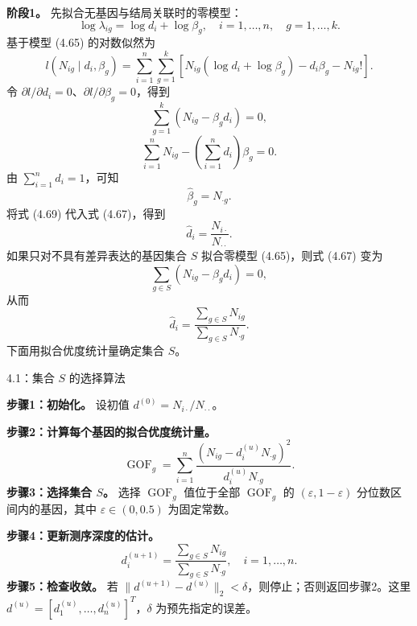 \par\medskip\noindent\textbf{阶段1。}
先拟合无基因与结局关联时的零模型：
\begin{equation}
\log\lambda_{ig}=\log d_i+\log\beta_g,\quad i=1,\ldots,n,\quad g=1,\ldots,k.
\tag{4.65}
\end{equation}
基于模型 (4.65) 的对数似然为
\begin{equation}
l(N_{ig}\mid d_i,\beta_g)=\sum_{i=1}^{n}\sum_{g=1}^{k}
\left[N_{ig}(\log d_i+\log\beta_g)-d_i\beta_g-N_{ig}!\right].
\tag{4.66}
\end{equation}
令 $\partial l/\partial d_i=0$、$\partial l/\partial\beta_g=0$，得到
\begin{equation}
\sum_{g=1}^{k}(N_{ig}-\beta_gd_i)=0,
\tag{4.67}
\end{equation}
\begin{equation}
\sum_{i=1}^{n}N_{ig}-\left(\sum_{i=1}^{n}d_i\right)\beta_g=0.
\tag{4.68}
\end{equation}
由 $\sum_{i=1}^{n}d_i=1$，可知
\begin{equation}
\hat\beta_g=N_{\cdot g}.
\tag{4.69}
\end{equation}
将式 (4.69) 代入式 (4.67)，得到
\begin{equation}
\hat d_i=\frac{N_{i\cdot}}{N_{\cdot\cdot}}.
\tag{4.70}
\end{equation}
如果只对不具有差异表达的基因集合 $S$ 拟合零模型 (4.65)，则式 (4.67) 变为
\[
\sum_{g\in S}(N_{ig}-\beta_gd_i)=0,
\]
从而
\begin{equation}
\hat d_i=\frac{\sum_{g\in S}N_{ig}}{\sum_{g\in S}N_{\cdot g}}.
\tag{4.71}
\end{equation}
下面用拟合优度统计量确定集合 $S$。

\begin{bookalgorithm}{4.1：集合 $S$ 的选择算法}
\par\noindent\textbf{步骤1：初始化。}
设初值 $d^{(0)}=N_{i\cdot}/N_{\cdot\cdot}$。

\noindent\textbf{步骤2：计算每个基因的拟合优度统计量。}
\begin{equation}
\operatorname{GOF}_g=\sum_{i=1}^{n}\frac{(N_{ig}-d_i^{(u)}N_{\cdot g})^2}{d_i^{(u)}N_{\cdot g}}.
\tag{4.72}
\end{equation}
\noindent\textbf{步骤3：选择集合 $S$。}
选择 $\operatorname{GOF}_g$ 值位于全部 $\operatorname{GOF}_g$ 的 $(\varepsilon,1-\varepsilon)$ 分位数区间内的基因，其中 $\varepsilon\in(0,0.5)$ 为固定常数。

\noindent\textbf{步骤4：更新测序深度的估计。}
\[
d_i^{(u+1)}=\frac{\sum_{g\in S}N_{ig}}{\sum_{g\in S}N_{\cdot g}},\quad i=1,\ldots,n.
\]
\noindent\textbf{步骤5：检查收敛。}
若 $\lVert d^{(u+1)}-d^{(u)}\rVert_2<\delta$，则停止；否则返回步骤2。这里 $d^{(u)}=[d_1^{(u)},\ldots,d_n^{(u)}]^T$，$\delta$ 为预先指定的误差。
\end{bookalgorithm}


